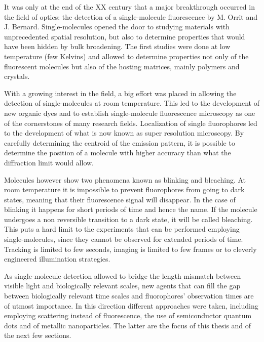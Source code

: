 It was only at the end of the XX century that a major breakthrough occurred in
the field of optics: the detection of a single-molecule fluorescence by M.
Orrit and J. Bernard\cite{PhysRevLett.65.2716}. Single-molecules opened the door
to studying materials with unprecedented spatial resolution, but also to determine properties that
would have been hidden by bulk broadening. The first studies were done at low
temperature (few Kelvins) and allowed to determine properties not only of the
fluorescent molecules but also of the hosting matrices, mainly polymers and
crystals.

With a growing interest in the field, a big effort was placed in allowing the
detection of single-molecules at room temperature. This led to the development
of new organic dyes and to establish single-molecule fluorescence microscopy as
one of the cornerstones of many research fields. Localization of single
fluorophores led to the development of what is now known as super resolution
microscopy\cite{moerner2015single}. By carefully determining the centroid of the
emission pattern, it is possible to determine the position of a molecule with
higher accuracy than what the diffraction limit would allow\cite{Moerner2007}.

Molecules however show two phenomena known as blinking and bleaching. At room
temperature it is impossible to prevent fluorophores from going to dark states,
meaning that their fluorescence signal will disappear. In the case of blinking
it happens for short periods of time and hence the name. If the molecule
undergoes a non reversible transition to a dark state, it will be called
bleaching. This puts a hard limit to the experiments that can be performed
employing single-molecules, since they cannot be observed for extended periods
of time. Tracking is limited to few seconds, imaging is limited to few frames or
to cleverly engineered illumination strategies.

As single-molecule detection allowed to bridge the length mismatch between
visible light and biologically relevant scales, new agents that can fill the gap
between biologically relevant time scales and fluorophores' observation times
are of utmost importance. In this direction different approaches were taken,
including employing scattering instead of
fluorescence\cite{ortega2012interferometric}, the use of semiconductor quantum
dots\cite{alivisatos2005quantum} and of metallic
nanoparticles\cite{huang2009gold}. The latter are the focus of this thesis and
of the next few sections.

